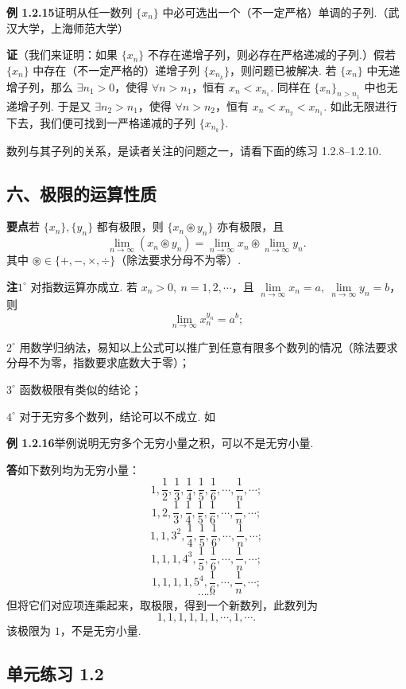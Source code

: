 \documentclass[UTF8, 12pt, fontset=fandol, oneside]{ctexart}
\begin{document}
\noindent\textbf{例 1.2.15}\quad 证明从任一数列 $\{x_n\}$ 中必可选出一个（不一定严格）单调的子列.（武汉大学，上海师范大学）

\noindent\textbf{证}\quad （我们来证明：如果 $\{x_n\}$ 不存在递增子列，则必存在严格递减的子列.）假若 $\{x_n\}$ 中存在（不一定严格的）递增子列 $\{x_{n_k}\}$，则问题已被解决. 若 $\{x_n\}$ 中无递增子列，那么 $\exists n_1>0$，使得 $\forall n>n_1$，恒有 $x_n<x_{n_1}$. 同样在 $\{x_n\}_{n>n_1}$ 中也无递增子列. 于是又 $\exists n_2>n_1$，使得 $\forall n>n_2$，恒有 $x_n<x_{n_2}<x_{n_1}$. 如此无限进行下去，我们便可找到一严格递减的子列 $\{x_{n_k}\}$.

数列与其子列的关系，是读者关注的问题之一，请看下面的练习 1.2.8--1.2.10.

\subsection*{六、极限的运算性质}

\noindent\textbf{要点}\quad 若 $\{x_n\},\{y_n\}$ 都有极限，则 $\{x_n\circledast y_n\}$ 亦有极限，且
\[
  \lim_{n\to\infty}(x_n\circledast y_n)
  =\lim_{n\to\infty}x_n\circledast\lim_{n\to\infty}y_n.
\]
其中 $\circledast\in\{+,-,\times,\div\}$（除法要求分母不为零）.

\noindent\textbf{注}\quad $1^\circ$ 对指数运算亦成立. 若 $x_n>0,\ n=1,2,\cdots$，且 $\lim\limits_{n\to\infty}x_n=a,\ \lim\limits_{n\to\infty}y_n=b$，则
\[
  \lim_{n\to\infty}x_n^{y_n}=a^b;
\]

$2^\circ$ 用数学归纳法，易知以上公式可以推广到任意有限多个数列的情况（除法要求分母不为零，指数要求底数大于零）；

$3^\circ$ 函数极限有类似的结论；

$4^\circ$ 对于无穷多个数列，结论可以不成立. 如

\noindent\textbf{例 1.2.16}\quad 举例说明无穷多个无穷小量之积，可以不是无穷小量.

\noindent\textbf{答}\quad 如下数列均为无穷小量：
\[
1,\frac12,\frac13,\frac14,\frac15,\frac16,\cdots,\frac1n,\cdots;
\]
\[
1,2,\frac13,\frac14,\frac15,\frac16,\cdots,\frac1n,\cdots;
\]
\[
1,1,3^2,\frac14,\frac15,\frac16,\cdots,\frac1n,\cdots;
\]
\[
1,1,1,4^3,\frac15,\frac16,\cdots,\frac1n,\cdots;
\]
\[
1,1,1,1,5^4,\frac16,\cdots,\frac1n,\cdots;
\]
\[
\cdots\cdots
\]
但将它们对应项连乘起来，取极限，得到一个新数列，此数列为
\[
1,1,1,1,1,1,\cdots,1,\cdots.
\]
该极限为 $1$，不是无穷小量.

\subsection*{单元练习 1.2}
\end{document}
